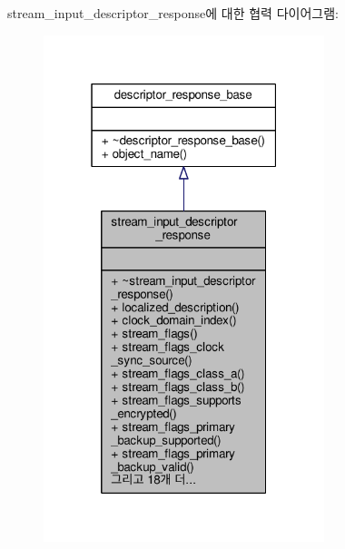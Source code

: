 stream\+\_\+input\+\_\+descriptor\+\_\+response에 대한 협력 다이어그램\+:
\nopagebreak
\begin{figure}[H]
\begin{center}
\leavevmode
\includegraphics[width=232pt]{classavdecc__lib_1_1stream__input__descriptor__response__coll__graph}
\end{center}
\end{figure}
